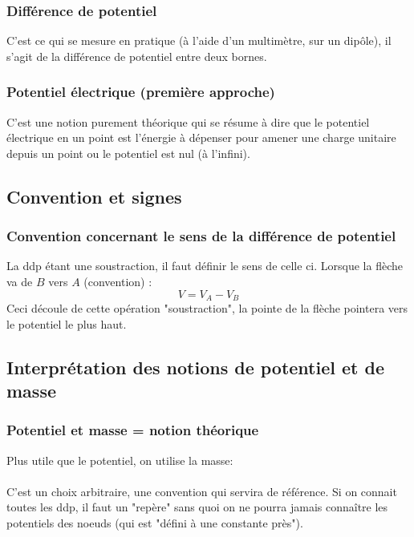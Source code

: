 \documentclass[british,french,11pt, a4paper, openany]{book}
\begin{document}
		\subsubsection{Différence de potentiel}
		C'est ce qui se mesure en pratique (à l'aide d'un multimètre, sur un dipôle), il s'agit de la différence de potentiel entre deux bornes.
		
		\subsubsection{Potentiel électrique (première approche)}
		C'est une notion purement théorique qui se résume à dire que le potentiel électrique en un point est l'énergie à dépenser pour amener une charge unitaire depuis un point ou le potentiel est nul (à l'infini).
		
		\subsection{Convention et signes}
		\subsubsection{Convention concernant le sens de la différence de potentiel}
		La ddp étant une soustraction, il faut définir le sens de celle ci.
		Lorsque la flèche va de $B$ vers $A$ (convention) :
		\begin{equation}
		V = V_A - V_B
		\end{equation}
		Ceci découle de cette opération "soustraction", la pointe de la flèche pointera vers le potentiel le plus haut.
		
		\subsection{Interprétation des notions de potentiel et de masse}
		\subsubsection{Potentiel et masse = notion théorique}
		Plus utile que le potentiel, on utilise la masse:\\
		\ \\
		
		C'est un choix arbitraire, une convention qui servira de référence.
		Si on connait toutes les ddp, il faut un "repère" sans quoi on ne pourra jamais connaître les potentiels des noeuds (qui est "défini à une constante près").
		
\end{document}
